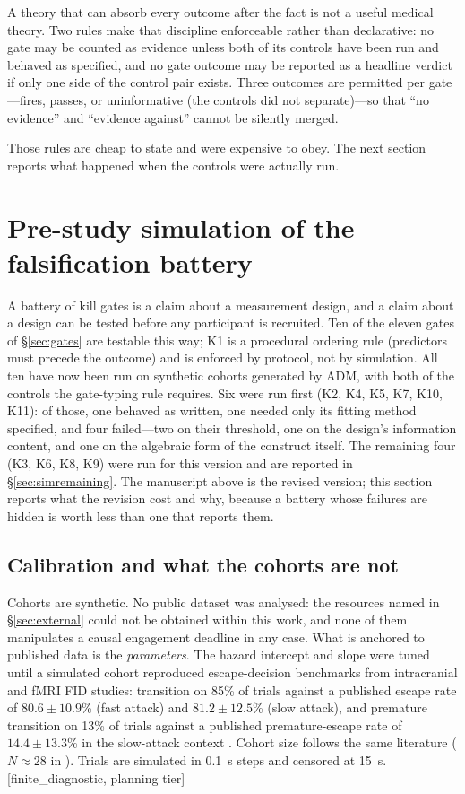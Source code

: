 \documentclass[9pt,twocolumn]{article}
\newcommand{\tier}[1]{{\sffamily\scriptsize\color{RRHMSlate}[#1]}}
\begin{document}
A theory that can absorb every outcome after the fact is not a useful medical theory. Two rules make that discipline enforceable rather than declarative: no gate may be counted as evidence unless both of its controls have been run and behaved as specified, and no gate outcome may be reported as a headline verdict if only one side of the control pair exists. Three outcomes are permitted per gate---fires, passes, or uninformative (the controls did not separate)---so that ``no evidence'' and ``evidence against'' cannot be silently merged.

Those rules are cheap to state and were expensive to obey. The next section reports what happened when the controls were actually run.

\section{Pre-study simulation of the falsification battery}
\label{sec:sim}
A battery of kill gates is a claim about a measurement design, and a claim about a design can be tested before any participant is recruited. Ten of the eleven gates of \S\ref{sec:gates} are testable this way; K1 is a procedural ordering rule (predictors must precede the outcome) and is enforced by protocol, not by simulation. All ten have now been run on synthetic cohorts generated by ADM, with both of the controls the gate-typing rule requires. Six were run first (K2, K4, K5, K7, K10, K11): of those, one behaved as written, one needed only its fitting method specified, and four failed---two on their threshold, one on the design's information content, and one on the algebraic form of the construct itself. The remaining four (K3, K6, K8, K9) were run for this version and are reported in \S\ref{sec:simremaining}. The manuscript above is the revised version; this section reports what the revision cost and why, because a battery whose failures are hidden is worth less than one that reports them.

\subsection{Calibration and what the cohorts are not}
Cohorts are synthetic. No public dataset was analysed: the resources named in \S\ref{sec:external} could not be obtained within this work, and none of them manipulates a causal engagement deadline in any case. What is anchored to published data is the \emph{parameters}. The hazard intercept and slope were tuned until a simulated cohort reproduced escape-decision benchmarks from intracranial and fMRI FID studies: transition on 85\% of trials against a published escape rate of $80.6\pm10.9$\% (fast attack) and $81.2\pm12.5$\% (slow attack), and premature transition on 13\% of trials against a published premature-escape rate of $14.4\pm13.3$\% in the slow-attack context \cite{zhang2025escape}. Cohort size follows the same literature ($N\approx28$ in \cite{qi2018}). Trials are simulated in 0.1~s steps and censored at 15~s. \tier{finite\_diagnostic, planning tier}
\end{document}

